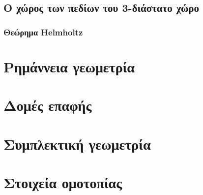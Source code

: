 \documentclass[11pt,a4paper,twoside,openright]{book}
\begin{document}
\section{Ο χώρος των πεδίων του 3-διάστατο χώρο}
\subsection{Θεώρημα Helmholtz}

\chapter{Ρημάννεια γεωμετρία}
	\label{chapter:riemannian-geometry}
	
\chapter{Δομές επαφής}
	\label{chapter:contact-structures}
	
\chapter{Συμπλεκτική γεωμετρία}
	\label{chapter:symplectic-geometry}
	
\chapter{Στοιχεία ομοτοπίας}
	\label{chapter:homotopy-theory}
\end{document}

